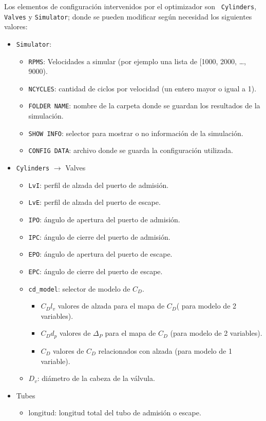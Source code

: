 Los elementos de configuración intervenidos por el optimizador son {\tt
Cylinders}, {\tt Valves} y {\tt Simulator}; donde se pueden modificar según
necesidad los siguientes valores:

\begin{itemize}
  \item {\tt Simulator}:
        \begin{itemize}
          \item {\tt RPMS}: Velocidades a simular (por ejemplo una lista de [1000,
2000, \ldots, 9000).
          \item {\tt NCYCLES}: cantidad de ciclos por velocidad (un entero mayor o igual a 1).
          \item {\tt FOLDER NAME}: nombre de la carpeta donde se guardan los
resultados de la simulación.
          \item {\tt SHOW INFO}: selector para mostrar o no información de la simulación.
          \item {\tt CONFIG DATA}: archivo donde se guarda la configuración utilizada.
        \end{itemize}
  \item {\tt Cylinders} $\longrightarrow$ Valves
        \begin{itemize}
          \item {\tt LvI}: perfil de alzada del puerto de admisión.
          \item {\tt LvE}: perfil de alzada del puerto de escape.
          \item {\tt IPO}: ángulo de apertura del puerto de admisión.
          \item {\tt IPC}: ángulo de cierre del puerto de admisión.
          \item {\tt EPO}: ángulo de apertura del puerto de escape.
          \item {\tt EPC}: ángulo de cierre del puerto de escape.
          \item {\tt cd\_model}: selector de modelo de $C_{D}$.
                \begin{itemize}
                  \item $C_{D}l_{v}$ valores de alzada para el mapa de $C_{D}$(
para modelo de 2 variables).
                  \item $C_{D}d_{p}$ valores de $\Delta_{P}$ para el mapa de
$C_{D}$ (para modelo de 2 variables).
                  \item $C_{D}$ valores de $C_{D}$ relacionados con alzada (para modelo de 1 variable).
                \end{itemize}
          \item $D_{v}$: diámetro de la cabeza de la válvula.
        \end{itemize}
  \item Tubes
        \begin{itemize}
          \item longitud: longitud total del tubo de admisión o escape.
        \end{itemize}
\end{itemize}
